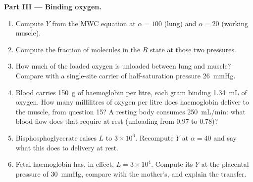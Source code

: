 \begin{problem}
\medskip
\noindent\textbf{Part III --- Binding oxygen.}
\begin{enumerate}[resume]
  \item Compute $Y$ from the MWC equation at $\alpha = 100$ (lung) and
        $\alpha = 20$ (working muscle).
  \item Compute the fraction of molecules in the $R$ state at those two
        pressures.
  \item How much of the loaded oxygen is unloaded between lung and
        muscle? Compare with a single-site carrier of half-saturation
        pressure \qty{26}{mmHg}.
  \item Blood carries \qty{150}{g} of haemoglobin per litre, each gram
        binding \qty{1.34}{mL} of oxygen. How many millilitres of
        oxygen per litre does haemoglobin deliver to the muscle, from
        question 15? A resting body consumes \qty{250}{mL/min}: what
        blood flow does that require at rest (unloading from $0.97$ to
        $0.78$)?
  \item Bisphosphoglycerate raises $L$ to $3\times 10^{6}$. Recompute
        $Y$ at $\alpha = 40$ and say what this does to delivery at
        rest.
  \item Fetal haemoglobin has, in effect, $L = 3\times 10^{4}$. Compute
        its $Y$ at the placental pressure of \qty{30}{mmHg}, compare
        with the mother's, and explain the transfer.
\end{enumerate}


\end{problem}
